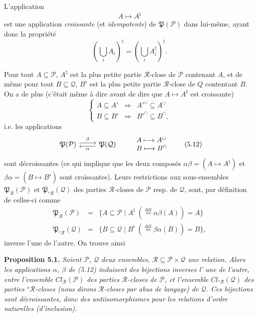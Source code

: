 \documentclass[11pt]{article}
\newcommand{\printedpage}[1]{\marginpar{\footnotesize p.~#1}}
\newcommand{\msp}[1]{\marginpar{\footnotesize [#1]}}
\newcommand{\cP}{\mathcal{P}}
\newcommand{\cQ}{\mathcal{Q}}
\newcommand{\cR}{\mathcal{R}}
\newcommand{\fP}{\mathfrak{P}}
\newcommand{\sR}{{}^{s}\mathcal{R}}
\begin{document}
L'application
\[
A \longmapsto A^{\natural}
\tag*{(5.10)}
\]
est une application \textit{croissante} (et \textit{idempotente}) de $\fP(\cP)$ dans lui-même, ayant donc la propriété
\msp{72}
\[
(\bigcup_i A_i)^{\natural} = (\bigcup_i A_i^{\natural})^{\natural}.
\]

\printedpage{45}

Pour tout $A \subseteq \cP$, $A^{\natural}$ est la plus petite partie $\cR$-close de $\cP$ contenant $A$, et de même pour tout $B \subseteq \cQ$, $B^{\flat}$ est la plus petite partie $\cR$-close de $Q$ contentant $B$. On a de plus (c'était même à dire avant de dire que $A \longmapsto A^{\natural}$ est croissante) %
\[
\left\{
\begin{array}{rcl}
A \subseteq A' & \Longrightarrow & A'^{\cup} \subseteq A^{\cup}\\[1ex]
B \subseteq B' & \Longrightarrow & B'^{\cap} \subseteq B^{\cap},
\end{array}
\right.
\tag*{(5.11)}
\]
i.e. les applications
\[
\begin{tikzcd}
\fP(\cP) \arrow[r, shift left, "\beta"] & \fP(\cQ) \arrow[l, shift left, "\alpha"]
\end{tikzcd}
\qquad
\begin{array}{l}
A \longmapsto A^{\cup}\\
B \longmapsto B^{\cap}
\end{array}
\tag*{(5.12)}
\]
sont décroissantes (ce qui implique que les deux composés $\alpha\beta = (A \longmapsto A^{\natural})$ et $\beta\alpha = (B \longmapsto B^{\flat})$ sont croissantes). Leurs restrictions aux sous-ensembles $\fP_{\cR}(\cP)$ et $\fP_{\sR}(\cQ)$ des parties $\cR$-closes de $\cP$ resp. de $\cQ$, sont, par définition de celles-ci comme
\[
\begin{array}{rcl}
\fP_{\cR}(\cP) & = & \{A \subseteq \cP \mid A^{\natural} \ (\overset{\text{déf}}{=} \alpha\beta(A)) = A\}\\
\fP_{\sR}(\cQ) & = & \{B \subseteq \cQ \mid B^{\flat} \ (\overset{\text{déf}}{=} \beta\alpha(B)) = B\},
\end{array}
\]
inverse l'une de l'autre. On trouve ainsi

\textbf{Proposition 5.1.} \textit{Soient $\cP$, $\cQ$ deux ensembles, $\cR \subseteq \cP \times \cQ$ une relation. Alors les applications $\alpha$, $\beta$ de (5.12) induisent des bijections inverses l'}
\msp{73}
\textit{une de l'autre, entre l'ensemble $\mathit{Cl}_{\cR}(\cP)$ des parties $\cR$-closes de $\cP$, et l'ensemble $\mathit{Cl}_{\sR}(\cQ)$ des parties ${}^{s}\cR$-closes (nous dirons $\cR$-closes par abus de langage) de $\cQ$. Ces bijections sont décroissantes, donc des antiisomorphismes pour les relations d'ordre naturelles (d'inclusion).}
\end{document}
